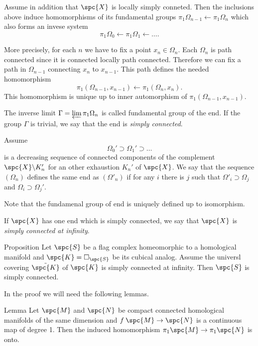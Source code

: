 Assume in addition that $\spc{X}$
is locally simply conneted.
Then the inclusions above induce 
homomorphisms of its fundamental groups 
$\pi_1\Omega_{n-1}\leftarrow\pi_1\Omega_n$ 
which also forms an invese system
\[\pi_1\Omega_0\leftarrow \pi_1\Omega_1\leftarrow\dots.\]

More precisely, for each $n$ we have to fix a point $x_n\in \Omega_n$.
Each $\Omega_n$ is path connected 
since it is connected locally path connected.
Therefore we can fix a path in $\Omega_{n-1}$
connecting $x_{n}$ to $x_{n-1}$.
This path defines the needed homomorphism 
\[\pi_1(\Omega_{n-1},x_{n-1})\leftarrow\pi_1(\Omega_n,x_n).\]
This homomorphism is unique up to inner automorphism of $\pi_1(\Omega_{n-1},x_{n-1})$.

The inverse limit $\Gamma=\varprojlim \pi_1\Omega_n$ is called fundamental group of the end.
If the group $\Gamma$ is trivial,
we say that the end is \emph{simply connected}.

Assume
\[\Omega_0'\supset \Omega_1'\supset \dots\]
is a decreasing sequence 
of connected components of the complement 
$\spc{X}\backslash K_n'$ for an other exhaustion $K_n'$ of $\spc{X}$.
We say that the sequence $(\Omega_n)$ defines the same end as $(\Omega'_n)$
if for any $i$ there is $j$ such that 
$\Omega'_i\supset \Omega_j$ and $\Omega_i\supset \Omega_j'$.

Note that the fundamenal group of end is uniquely defined up to isomorphism.

If $\spc{X}$ has one end which is simply connected,
we say that $\spc{X}$ is \emph{simply connected at infinity}.


\begin{thm}{Proposition}\label{prop:example-pi_infty}
Let $\spc{S}$ be a flag complex homeomorphic to a homological manifold
and $\spc{K}=\square_{\spc{S}}$ be its cubical analog.
Assume the universl covering $\tilde{\spc{K}}$ of $\spc{K}$ is simply connected at infinity.
Then $\spc{S}$ is simply connected.
\end{thm}


In the proof we will need the following lemmas.

\begin{thm}{Lemma}\label{lem:deg=1=>epi-pi1}
Let $\spc{M}$ and $\spc{N}$ be compact connected homological manifolds of the same dimension
and $f\:\spc{M}\to \spc{N}$ is a continuous map of degree 1.
Then the induced homomorphism $\pi_1\spc{M}\to \pi_1\spc{N}$
is onto.
\end{thm}

